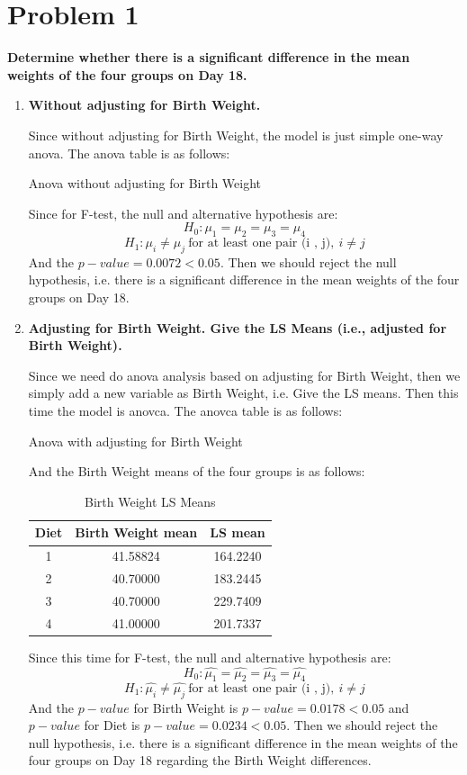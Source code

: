 \documentclass[10pt,letterpaper]{article}
\begin{document}
\section*{Problem 1}
\textbf{Determine whether there is a significant difference in the mean weights of the four groups on Day 18.}
\begin{enumerate}[leftmargin=0cm,itemindent=.5cm,labelwidth=\itemindent,labelsep=0cm,align=left]
\item[\textbullet] \textbf{Without adjusting for Birth Weight.}

Since without adjusting for Birth Weight, the model is just simple one-way anova. The anova table is as follows:
\begin{center}
Anova without adjusting for Birth Weight

\end{center} 
Since for F-test, the null and alternative hypothesis are:
\[H_0: \mu_1=\mu_2=\mu_3=\mu_4\]
\[H_1: \mu_i \neq \mu_j  \ \text{for at least one pair (i , j)},\  i \neq j\]
And the $p-value = 0.0072<0.05$. Then we should reject the null hypothesis, i.e. there is a significant difference in the mean weights of the four groups on Day 18. 

\item[\textbullet] \textbf{Adjusting for Birth Weight. Give the LS Means (i.e., adjusted for Birth Weight).}

Since we need do anova analysis based on adjusting for Birth Weight, then we simply add a new variable as Birth Weight, i.e. Give the LS means. Then this time the model is anovca. The anovca table is as follows:
\begin{center}
Anova with adjusting for Birth Weight

\end{center} 

And the Birth Weight means of the four groups is as follows:
\begin{table}[h]
\caption{Birth Weight LS Means}
\centering
\begin{tabular*}{0.5\linewidth}{@{\extracolsep{\fill}}ccc}
\hline 
Diet & Birth Weight mean & LS mean\\
\hline
1 & 41.58824 & 164.2240\\
\hline
2 & 40.70000 & 183.2445\\
\hline
3 & 40.70000 & 229.7409\\
\hline
4 & 41.00000 & 201.7337\\
\hline
\end{tabular*}
\end{table}
Since this time for F-test, the null and alternative hypothesis are:
\[H_0: \hat{\mu_1}=\hat{\mu_2}=\hat{\mu_3}=\hat{\mu_4}\]
\[H_1: \hat{\mu_i} \neq \hat{\mu_j}  \ \text{for at least one pair (i , j)},\  i \neq j\]
And the $p-value$ for Birth Weight is $p-value = 0.0178<0.05$ and $p-value$ for Diet is $p-value = 0.0234<0.05$. Then we should reject the null hypothesis, i.e. there is a significant difference in the mean weights of the four groups on Day 18 regarding the Birth Weight differences.


\end{enumerate}
\end{document}

